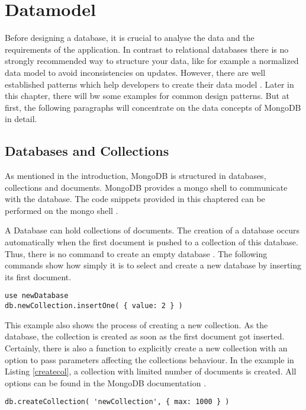 \section{Datamodel}
Before designing a database, it is crucial to analyse the data and the requirements of the application. In contrast to relational databases there is no strongly recommended way to structure your data, like for example a normalized data model to avoid inconsistencies on updates. However, there are well established patterns which help developers to create their data model \cite{mdbinaction}. Later in this chapter, there will bw some examples for common design patterns. But at first, the following paragraphs will concentrate on the data concepts of MongoDB in detail.

\subsection{Databases and Collections}
As mentioned in the introduction, MongoDB is structured in databases, collections and documents. MongoDB provides a mongo shell to communicate with the database. The code snippets provided in this chaptered can be performed on the mongo shell \cite{mdbdocu}.

A Database can hold collections of documents. The creation of a database occurs automatically when the first document is pushed to a collection of this database. Thus, there is no command to create an empty database \cite{mdbdocu}. The following commands show how simply it is to select and create a new database by inserting its first document.

\begin{lstlisting}[frame=single, caption=Create Database, label=createdb]
use newDatabase
db.newCollection.insertOne( { value: 2 } )
\end{lstlisting}


This example also shows the process of creating a new collection. As the database, the collection is created as soon as the first document got inserted. Certainly, there is also a function to explicitly create a new collection with an option to pass parameters affecting the collections behaviour. In the example in Listing \ref{createcol}, a collection with limited number of documents is created. All options can be found in the MongoDB documentation \cite{mdbdocu}.

\begin{lstlisting}[frame=single, caption=Create Collection, label=createcol]
db.createCollection( 'newCollection', { max: 1000 } )
\end{lstlisting}


